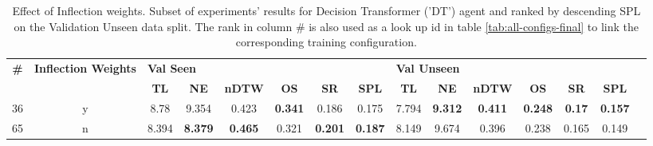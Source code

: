 \begin{table}
\centering
\caption{\label{tab:dt_inflection_weights}Effect of Inflection weights. Subset of experiments' results for Decision Transformer ('DT') agent and ranked by descending SPL on the Validation Unseen data split. The rank in column \# is also used as a look up id in table \ref{tab:all-configs-final} to link the corresponding training configuration.}
\begin{tabular}{@{\hskip3pt}c@{\hskip3pt}c@{\hskip3pt}c@{\hskip3pt}c@{\hskip3pt}c@{\hskip3pt}c@{\hskip3pt}c@{\hskip3pt}c@{\hskip3pt}c@{\hskip3pt}c@{\hskip3pt}c@{\hskip3pt}c@{\hskip3pt}c@{\hskip3pt}c@{\hskip3pt}c}
\toprule
\textbf{\#} & \textbf{Inflection Weights} & \multicolumn{6}{l}{\textbf{Val Seen}} & \multicolumn{6}{l}{\textbf{Val Unseen}} \\
 \textbf{~} &                  \textbf{~} &       \textbf{TL} &     \textbf{NE} &   \textbf{nDTW} &     \textbf{OS} &     \textbf{SR} &    \textbf{SPL} &         \textbf{TL} &     \textbf{NE} &   \textbf{nDTW} &     \textbf{OS} &    \textbf{SR} &    \textbf{SPL} \\
\midrule
         36 &                           y &              8.78 &           9.354 &           0.423 &  \textbf{0.341} &           0.186 &           0.175 &               7.794 &  \textbf{9.312} &  \textbf{0.411} &  \textbf{0.248} &  \textbf{0.17} &  \textbf{0.157} \\
         65 &                           n &             8.394 &  \textbf{8.379} &  \textbf{0.465} &           0.321 &  \textbf{0.201} &  \textbf{0.187} &               8.149 &           9.674 &           0.396 &           0.238 &          0.165 &           0.149 \\
\bottomrule
\end{tabular}
\end{table}
